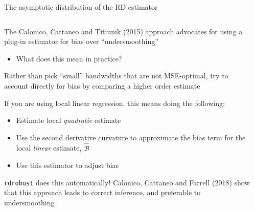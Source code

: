 \documentclass[notes,11pt, aspectratio=169]{beamer}
\newenvironment{wideitemize}{\itemize\addtolength{\itemsep}{10pt}}{\enditemize}
\begin{document}
\begin{frame}{The asymptotic distribution of the RD estimator}
    \begin{columns}[onlytextwidth, T] %
      \begin{column}{.9\textwidth}
        \begin{wideitemize}
        \item The Calonico, Cattaneo and Titiunik (2015) approach
          advocates for using a plug-in estimator for bias over
          ``undersmoothing''
          \begin{itemize}
          \item What does this mean in practice? 
          \end{itemize}
        \item Rather than pick ``small'' bandwidths that are not
          MSE-optimal, try to account directly for bias by comparing a
          higher order estimate
        \item If you are using local linear regression, this means
          doing the following:
          \begin{itemize}
          \item Estimate local \emph{quadratic} estimate
          \item Use the second derivative curvature to approximate the
            bias term for the local \emph{linear} estimate, $\hat{\mathcal{B}}$
          \item Use this estimator to adjust bias
          \end{itemize}
        \item \texttt{rdrobust} does this automatically!  Calonico,
          Cattaneo and Farrell (2018) show that this approach leads to
          correct inference, and preferable to undersmoothing
      \end{wideitemize}
      \end{column}%
      \hfill%
      \begin{column}{.5\textwidth}
      \end{column}%
    \end{columns}
\end{frame}
\end{document}
